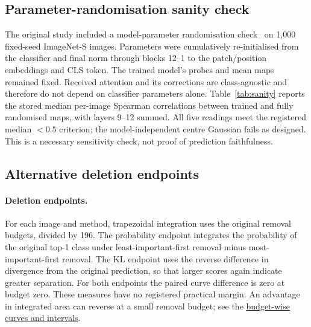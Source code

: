 \subsection{Parameter-randomisation sanity check}
\label{app:sanity}

The original study included a model-parameter randomisation check~\citep{adebayo2018} on 1,000 fixed-seed ImageNet-S images. Parameters were cumulatively re-initialised from the classifier and final norm through blocks 12--1 to the patch/position embeddings and CLS token. The trained model's probes and mean maps remained fixed. Received attention and its corrections are class-agnostic and therefore do not depend on classifier parameters alone. Table~\ref{tab:sanity} reports the stored median per-image Spearman correlations between trained and fully randomised maps, with layers 9--12 summed. All five readings meet the registered median $<0.5$ criterion; the model-independent centre Gaussian fails as designed. This is a necessary sensitivity check, not proof of prediction faithfulness.

\begin{table}[!htbp]
\caption{Stored model-randomisation results: median map correlation after full randomisation. The five readings pass the registered $<0.5$ criterion in every model.}
\label{tab:sanity}
\centering\small

\end{table}

\subsection{Alternative deletion endpoints}
\paragraph{Deletion endpoints.} For each image and method, trapezoidal integration uses the original removal budgets, divided by 196. The probability endpoint integrates the probability of the original top-1 class under least-important-first removal minus most-important-first removal. The KL endpoint uses the reverse difference in divergence from the original prediction, so that larger scores again indicate greater separation. For both endpoints the paired curve difference is zero at budget zero. These measures have no registered practical margin. An advantage in integrated area can reverse at a small removal budget; see the \href{https://github.com/hhuang999/vit-fastweight-lens/blob/main/docs/figures/deletion_curves.pdf}{budget-wise curves and intervals}.

